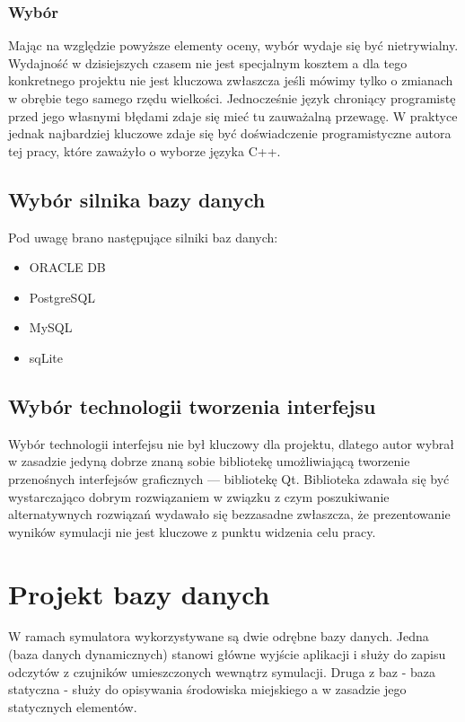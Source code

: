 {\subsubsection{Wybór}
\par{
Mając na względzie powyższe elementy oceny, wybór wydaje się być nietrywialny. Wydajność w dzisiejszych czasem nie jest specjalnym kosztem a dla tego konkretnego projektu nie jest kluczowa zwłaszcza jeśli mówimy tylko o zmianach w obrębie tego samego rzędu wielkości. Jednocześnie język chroniący programistę przed jego własnymi błędami zdaje się mieć tu zauważalną przewagę. W praktyce jednak najbardziej kluczowe zdaje się być doświadczenie programistyczne autora tej pracy, które zaważyło o wyborze języka C++.
}

\subsection{Wybór silnika bazy danych}
\par{
Pod uwagę brano następujące silniki baz danych:
\begin{itemize}
\item ORACLE DB
\item PostgreSQL
\item MySQL
\item sqLite
\end{itemize}
}

\subsection{Wybór technologii tworzenia interfejsu}
\par{
Wybór technologii interfejsu nie był kluczowy dla projektu, dlatego autor wybrał w zasadzie jedyną dobrze znaną sobie bibliotekę umożliwiającą tworzenie przenośnych interfejsów graficznych --- bibliotekę Qt. Biblioteka zdawała się być wystarczająco dobrym rozwiązaniem w związku z czym poszukiwanie alternatywnych rozwiązań wydawało się bezzasadne zwłaszcza, że prezentowanie wyników symulacji nie jest kluczowe z punktu widzenia celu pracy.
}

\section[Projekt bazy danych][Projekt bazy danych]{Projekt bazy danych}
\par{
W ramach symulatora wykorzystywane są dwie odrębne bazy danych. Jedna (baza danych dynamicznych) stanowi główne wyjście aplikacji i służy do zapisu odczytów z czujników umieszczonych wewnątrz symulacji. Druga z baz - baza statyczna - służy do opisywania środowiska miejskiego a w zasadzie jego statycznych elementów.
}

}
